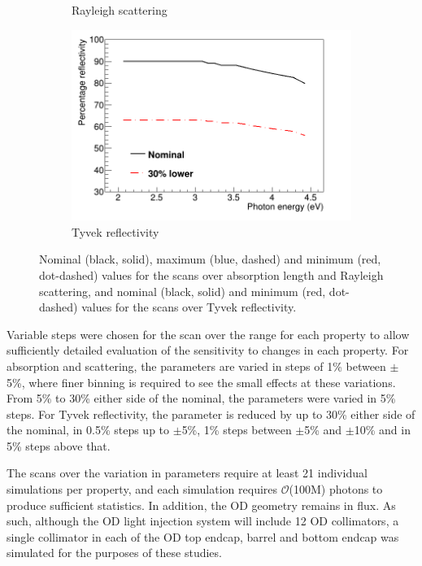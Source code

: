 \documentclass[a4paper,11pt]{article}
\begin{document}
\begin{figure}[ht!]
\begin{subfigure}{0.32\textwidth}
         \caption{Rayleigh scattering}
     \end{subfigure}
     \hfill
     \begin{subfigure}{0.32\textwidth}
         \centering
         \includegraphics[width=\linewidth]{TyvekReflectivity.png}
         \caption{Tyvek reflectivity}
     \end{subfigure}
     \caption{Nominal (black, solid), maximum (blue, dashed) and minimum (red, dot-dashed) values for the scans over absorption length and Rayleigh scattering, and nominal (black, solid) and minimum (red, dot-dashed) values for the scans over Tyvek reflectivity.}
     \label{fig:collimatorScans}
\end{figure}

Variable steps were chosen for the scan over the range for each property to allow sufficiently detailed evaluation of the sensitivity to changes in each property. For absorption and scattering, the parameters are varied in steps of 1\% between $\pm$5\%, where finer binning is required to see the small effects at these variations. From 5\% to 30\% either side of the nominal, the parameters were varied in 5\% steps. For Tyvek reflectivity, the parameter is reduced by up to 30\% either side of the nominal, in 0.5\% steps up to $\pm$5\%, 1\% steps between $\pm$5\% and $\pm$10\% and in 5\% steps above that. 

The scans over the variation in parameters require at least 21 individual simulations per property, and each simulation requires $\mathcal{O}$(100M) photons to produce sufficient statistics. In addition, the OD geometry remains in flux. As such, although the OD light injection system will include 12 OD collimators, a single collimator in each of the OD top endcap, barrel and bottom endcap was simulated for the purposes of these studies.
\end{document}
